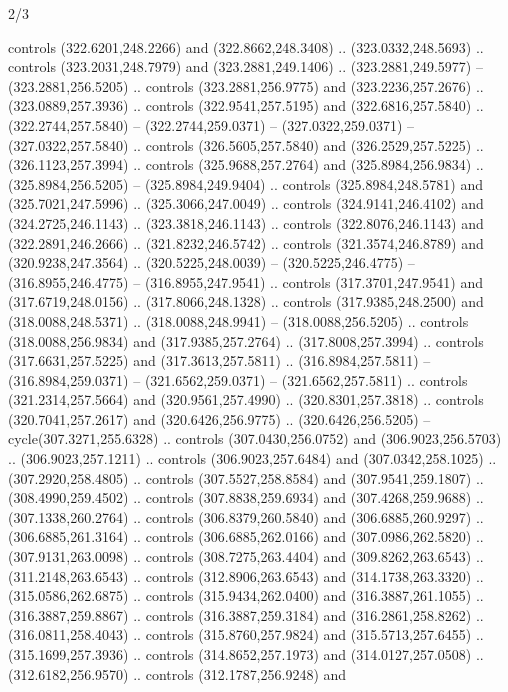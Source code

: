 \begin{flagdescription}{2/3}
\begin{scope}[xshift=0.5\flaglength,yshift=0.5\flagwidth,scale=\flagwidth/235.81]
\begin{scope}[y=0.8pt, x=0.8pt, yscale=-1,shift={(-239.08,-147.38)}]
    controls (322.6201,248.2266) and (322.8662,248.3408) .. (323.0332,248.5693) ..
    controls (323.2031,248.7979) and (323.2881,249.1406) .. (323.2881,249.5977) --
    (323.2881,256.5205) .. controls (323.2881,256.9775) and (323.2236,257.2676) ..
    (323.0889,257.3936) .. controls (322.9541,257.5195) and (322.6816,257.5840) ..
    (322.2744,257.5840) -- (322.2744,259.0371) -- (327.0322,259.0371) --
    (327.0322,257.5840) .. controls (326.5605,257.5840) and (326.2529,257.5225) ..
    (326.1123,257.3994) .. controls (325.9688,257.2764) and (325.8984,256.9834) ..
    (325.8984,256.5205) -- (325.8984,249.9404) .. controls (325.8984,248.5781) and
    (325.7021,247.5996) .. (325.3066,247.0049) .. controls (324.9141,246.4102) and
    (324.2725,246.1143) .. (323.3818,246.1143) .. controls (322.8076,246.1143) and
    (322.2891,246.2666) .. (321.8232,246.5742) .. controls (321.3574,246.8789) and
    (320.9238,247.3564) .. (320.5225,248.0039) -- (320.5225,246.4775) --
    (316.8955,246.4775) -- (316.8955,247.9541) .. controls (317.3701,247.9541) and
    (317.6719,248.0156) .. (317.8066,248.1328) .. controls (317.9385,248.2500) and
    (318.0088,248.5371) .. (318.0088,248.9941) -- (318.0088,256.5205) .. controls
    (318.0088,256.9834) and (317.9385,257.2764) .. (317.8008,257.3994) .. controls
    (317.6631,257.5225) and (317.3613,257.5811) .. (316.8984,257.5811) --
    (316.8984,259.0371) -- (321.6562,259.0371) -- (321.6562,257.5811) .. controls
    (321.2314,257.5664) and (320.9561,257.4990) .. (320.8301,257.3818) .. controls
    (320.7041,257.2617) and (320.6426,256.9775) .. (320.6426,256.5205) --
    cycle(307.3271,255.6328) .. controls (307.0430,256.0752) and
    (306.9023,256.5703) .. (306.9023,257.1211) .. controls (306.9023,257.6484) and
    (307.0342,258.1025) .. (307.2920,258.4805) .. controls (307.5527,258.8584) and
    (307.9541,259.1807) .. (308.4990,259.4502) .. controls (307.8838,259.6934) and
    (307.4268,259.9688) .. (307.1338,260.2764) .. controls (306.8379,260.5840) and
    (306.6885,260.9297) .. (306.6885,261.3164) .. controls (306.6885,262.0166) and
    (307.0986,262.5820) .. (307.9131,263.0098) .. controls (308.7275,263.4404) and
    (309.8262,263.6543) .. (311.2148,263.6543) .. controls (312.8906,263.6543) and
    (314.1738,263.3320) .. (315.0586,262.6875) .. controls (315.9434,262.0400) and
    (316.3887,261.1055) .. (316.3887,259.8867) .. controls (316.3887,259.3184) and
    (316.2861,258.8262) .. (316.0811,258.4043) .. controls (315.8760,257.9824) and
    (315.5713,257.6455) .. (315.1699,257.3936) .. controls (314.8652,257.1973) and
    (314.0127,257.0508) .. (312.6182,256.9570) .. controls (312.1787,256.9248) and

\end{scope}
\end{scope}
\end{flagdescription}

